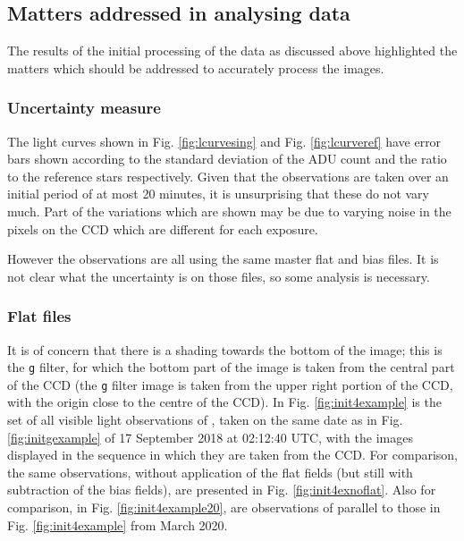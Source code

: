 \subsection{Matters addressed in analysing data}
\protect\label{section:mattersaddressed}

The results of the initial processing of the data as discussed above highlighted
the matters which should be addressed to accurately process the images.

\subsubsection{Uncertainty measure}
\protect\label{section:issueuncertainty}

The light curves shown in Fig. \ref{fig:lcurvesing} and Fig. \ref{fig:lcurveref}
have error bars shown according to the standard deviation of the ADU count and
the ratio to the reference stars respectively. Given that the observations are
taken over an initial period of at most 20 minutes, it is unsurprising that
these do not vary much. Part of the variations which are shown may be due to
varying noise in the pixels on the CCD which are different for each exposure.

However the observations are all using the same master flat and bias files. It
is not clear what the uncertainty is on those files, so some analysis is
necessary.

\subsubsection{Flat files}
\protect\label{section:issueflatfiles}

It is of concern that there is a shading towards the bottom of the image; this
is the \texttt{g} filter, for which the bottom part of the image is taken from
the central part of the CCD (the \texttt{g} filter image is taken from the
upper right portion of the CCD, with the origin close to the centre of the CCD).
In Fig. \ref{fig:init4example} is the set of all visible light observations of
\prox, taken on the same date as in Fig. \ref{fig:initgexample} of 17 September 2018 at
02:12:40 UTC, with the images displayed in the sequence in which they are taken
from the CCD. For comparison, the same observations, without application of the
flat fields (but still with subtraction of the bias fields), are presented in
Fig. \ref{fig:init4exnoflat}. Also for comparison, in Fig.
\ref{fig:init4example20}, are observations of {\prox} parallel to those in Fig.
\ref{fig:init4example} from March 2020.

